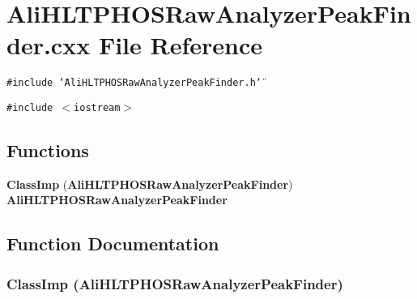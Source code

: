 \section{Ali\-HLTPHOSRaw\-Analyzer\-Peak\-Finder.cxx File Reference}
\label{AliHLTPHOSRawAnalyzerPeakFinder_8cxx}
{\tt \#include \char`\"{}Ali\-HLTPHOSRaw\-Analyzer\-Peak\-Finder.h\char`\"{}}\par
{\tt \#include $<$iostream$>$}\par
\subsection*{Functions}
\begin{CompactItemize}
\item 
{\bf Class\-Imp} ({\bf Ali\-HLTPHOSRaw\-Analyzer\-Peak\-Finder}) {\bf Ali\-HLTPHOSRaw\-Analyzer\-Peak\-Finder}
\end{CompactItemize}


\subsection{Function Documentation}
\subsubsection{\setlength{\rightskip}{0pt plus 5cm}Class\-Imp ({\bf Ali\-HLTPHOSRaw\-Analyzer\-Peak\-Finder})}\label{AliHLTPHOSRawAnalyzerPeakFinder_8cxx_a0}


